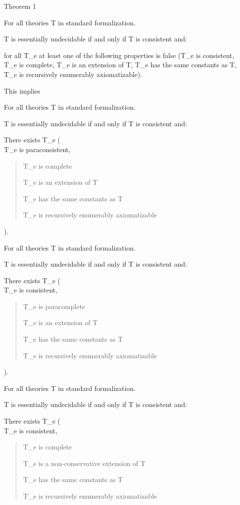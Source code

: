 Theorem 1

For all theories T in standard formalization.

T is essentially undecidable if and only if T is consistent and:

for all T\_e at least one of the following properties is false (T\_e is
consistent, T\_e is complete, T\_e is an extension of T, T\_e has the
same constants as T, T\_e is recursively enumerably axiomatizable).

This implies

For all theories T in standard formalization.

T is essentially undecidable if and only if T is consistent and:

There exists T\_e (\\
T\_e is paraconsistent,

\begin{quote}
T\_e is complete

T\_e is an extension of T

T\_e has the same constants as T

T\_e is recursively enumerably axiomatizable
\end{quote}

).

For all theories T in standard formalization.

T is essentially undecidable if and only if T is consistent and:

There exists T\_e (\\
T\_e is consistent,

\begin{quote}
T\_e is paracomplete

T\_e is an extension of T

T\_e has the same constants as T

T\_e is recursively enumerably axiomatizable
\end{quote}

).

For all theories T in standard formalization.

T is essentially undecidable if and only if T is consistent and:

There exists T\_e (\\
T\_e is consistent,

\begin{quote}
T\_e is complete

T\_e is a non-conservative extension of T

T\_e has the same constants as T

T\_e is recursively enumerably axiomatizable
\end{quote}

